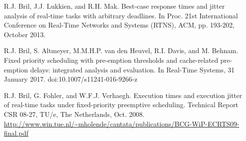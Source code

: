 \documentclass[fleqn]{article}
\begin{document}
\begin{thebibliography}{10}
	R.J. Bril, J.J. Lukkien, and R.H. Mak.
	Best-case response times and jitter analysis of real-time tasks with arbitrary deadlines.
	In Proc. 21st International Conference on Real-Time Networks and Systems (RTNS), ACM, pp. 193-202, October 2013.
	
	R.J. Bril, S. Altmeyer, M.M.H.P. van den Heuvel, R.I. Davis, and M. Behnam.
	Fixed priority scheduling with pre-emption thresholds and cache-related pre-emption delays: integrated analysis and evaluation.
	In Real-Time Systems, 31 January 2017.	
	doi:10.1007/s11241-016-9266-z
	
	R.J. Bril, G. Fohler, and W.F.J. Verhaegh. 
	Execution times and execution jitter of real-time tasks under fixed-priority preemptive scheduling. 
	Technical Report CSR 08-27, TU/e, The Netherlands, Oct. 2008. \url{http://www.win.tue.nl/~mholende/cantata/publications/BCG-WiP-ECRTS09-final.pdf}
	
	
\end{thebibliography}
\end{document}
